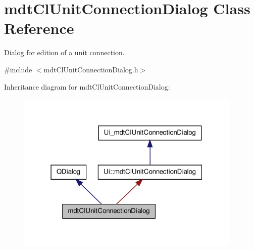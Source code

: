 \hypertarget{classmdt_cl_unit_connection_dialog}{\section{mdt\-Cl\-Unit\-Connection\-Dialog Class Reference}
\label{classmdt_cl_unit_connection_dialog}
}


Dialog for edition of a unit connection.  




{\ttfamily \#include $<$mdt\-Cl\-Unit\-Connection\-Dialog.\-h$>$}



Inheritance diagram for mdt\-Cl\-Unit\-Connection\-Dialog\-:\nopagebreak
\begin{figure}[H]
\begin{center}
\leavevmode
\includegraphics[width=304pt]{classmdt_cl_unit_connection_dialog__inherit__graph}
\end{center}
\end{figure}


